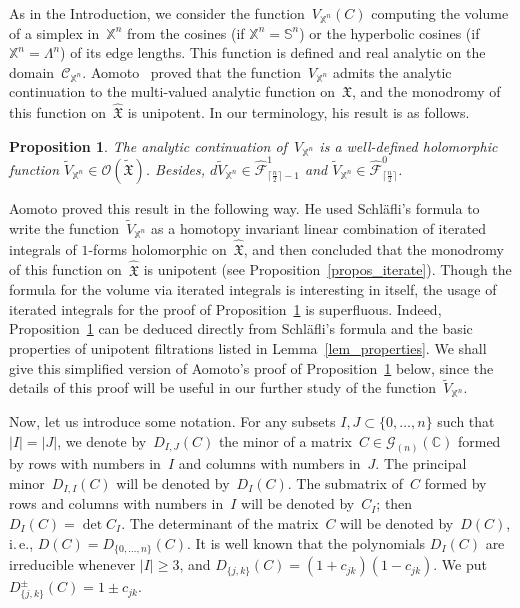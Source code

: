\documentclass[reqno,tbtags,12pt]{amsart}
\numberwithin{equation}{section}
\newcommand{\CC}{\mathcal{C}}
\newcommand{\C}{\mathbb{C}}
\newcommand{\X}{\mathbb{X}}
\newcommand{\FX}{\mathfrak{X}}
\newcommand{\tFX}{\widetilde{\mathfrak{X}}}
\newcommand{\hFX}{\widehat{\mathfrak{X}}}
\newcommand{\hCF}{\widehat{\mathcal{F}}}
\newcommand{\CO}{\mathcal{O}}
\newcommand{\bS}{\mathbb{S}}
\newcommand{\tV}{\widetilde{V}}
\newcommand{\CG}{\mathcal{G}}
\newtheorem{propos}[theorem]{Proposition}
\theoremstyle{definition}
\begin{document}
As in the Introduction, we consider   the function~$V_{\X^n}(C)$ computing the volume of a simplex in~$\X^n$  from the cosines (if $\X^n=\bS^n$) or the hyperbolic cosines (if $\X^n=\Lambda^n$) of its edge lengths. This function is defined and real analytic on  the domain~$\CC_{\X^n}$. Aomoto~\cite{Aom77}  proved that the function~$V_{\X^n}$ admits the analytic continuation to the multi-valued analytic function on~$\FX$, and the monodromy of this function on~$\hFX$ is unipotent. In our terminology, his result is as follows.

\begin{propos}\label{propos_fh}
The analytic continuation of\/~$V_{\X^n}$ is a well-defined holomorphic function $\tV_{\X^n}\in\CO(\tFX)$. Besides, $d\tV_{\X^n}\in\hCF^1_{\lceil\frac{n}{2}\rceil-1}$ and\/ $\tV_{\X^n}\in\hCF^0_{\lceil\frac{n}{2}\rceil}$.
\end{propos}  

Aomoto proved this result in the following way. He used Schl\"afli's formula to write the function~$\tV_{\X^n}$ as a homotopy invariant linear combination of iterated integrals of $1$-forms holomorphic on~$\hFX$, and then concluded that the monodromy of this function on~$\hFX$ is unipotent (see Proposition~\ref{propos_iterate}). Though the formula for the volume via iterated integrals is interesting in itself, the usage of iterated integrals for the proof of Proposition~\ref{propos_fh} is superfluous. Indeed, Proposition~\ref{propos_fh} can be deduced directly from Schl\"afli's formula and the basic properties of unipotent filtrations listed in Lemma~\ref{lem_properties}. We shall give this simplified version of Aomoto's proof of  Proposition~\ref{propos_fh} below, since the details of this proof will be useful in our further study  of the function~$\tV_{\X^n}$. 

Now, let us introduce some notation.
For any subsets $I,J\subset \{0,\ldots,n\}$ such that $|I|=|J|$, we denote by~$D_{I,J}(C)$ the minor of a matrix~$C\in\CG_{(n)}(\C)$  formed by rows with numbers in~$I$ and columns with numbers in~$J$. The principal minor~$D_{I,I}(C)$ will be denoted by~$D_I(C)$. The submatrix of~$C$ formed by rows and columns with numbers in~$I$ will be denoted by~$C_I$; then $D_I(C)=\det C_I$.  
The determinant  of the matrix~$C$ will be denoted by~$D(C)$, i.\,e., $D(C)=D_{\{0,\ldots, n\}}(C)$. It is well known that the polynomials $D_I(C)$ are irreducible whenever $|I|\ge 3$, and $D_{\{j,k\}}(C)=(1+c_{jk})(1-c_{jk})$. We put $D_{\{j,k\}}^{\pm}(C)=1\pm c_{jk}$. 
\end{document}
